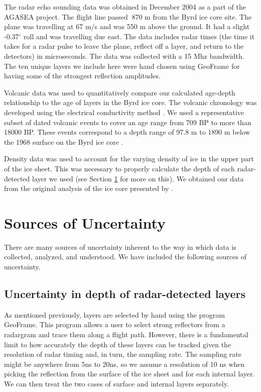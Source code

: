 \documentclass[draft,jgrga]{agutex}
\begin{document}
The radar echo sounding data was obtained in December 2004 as a part
of the AGASEA project. The flight line passed $~$870 m from the Byrd
ice core site. The plane was travelling at 67 m/s and was 550 m above the
ground. It had a slight -0.37$^{\circ}$ roll and was travelling due
east. The data includes radar times (the time it takes for a radar
pulse to leave the plane, reflect off a layer, and return to the
detectors) in microseconds. The data was collected with a 15 Mhz
bandwidth. The ten unique layers we include here were
hand chosen using GeoFrame for having some of the strongest reflection amplitudes.

Volcanic data was used to quantitatively compare our calculated
age-depth relationship to the age of layers in the Byrd ice core. The
volcanic chronology was developed using the electrical conductivity
method \citep{Hammer94}. We used a representative subset of dated
volcanic events to cover an age range from 709 BP to more than 18000 BP. 
These events correspond to a depth range of 97.8 m to 1890 m below the
1968 surface on the Byrd ice core \citet{Gow68}.

Density data was used to account for the varying density of ice in the upper part of the ice sheet. This was necessary to properly
calculate the depth of each radar-detected layer we used (see Section
\ref{unc} for more on this). We obtained our data from the
original analysis of the ice core presented by \citet{Gow68}.




\section{Sources of Uncertainty}\label{unc}
There are many sources of uncertainty inherent to the way in which
data is collected, analyzed, and understood. We have included the
following sources of uncertainty.

\subsection{Uncertainty in depth of radar-detected layers}

As mentioned previously, layers are selected by hand using the program
GeoFrame. This program allows a user to select strong
reflectors from a radargram and trace them along a flight
path. However, there is a fundamental limit to how accurately the
depth of these layers can be tracked given the resolution of radar
timing and, in turn, the sampling rate. The sampling rate might be
anywhere from 5ns to 20ns, so we assume a resolution of 
10 ns when picking the reflection
from the surface of the ice sheet and for each internal
layer. We can then treat the two cases of surface and internal layers
separately.
\end{document}
